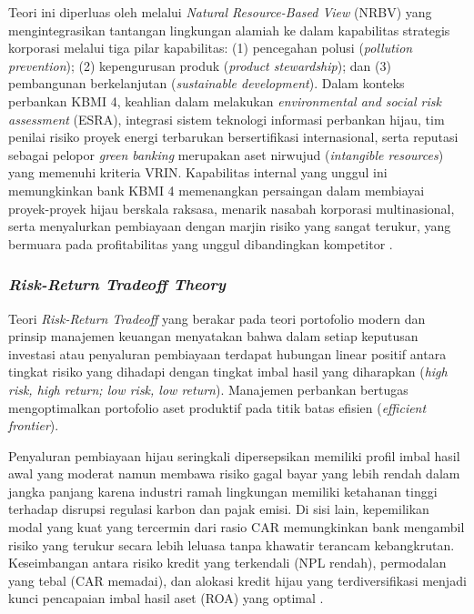 \documentclass[12pt,a4paper]{article}
\numberwithin{equation}{section}
\begin{document}
\noindent
Teori ini diperluas oleh \citet{Hart1995} melalui \emph{Natural Resource-Based View} (NRBV) yang mengintegrasikan tantangan lingkungan alamiah ke dalam kapabilitas strategis korporasi melalui tiga pilar kapabilitas: (1) pencegahan polusi (\emph{pollution prevention}); (2) kepengurusan produk (\emph{product stewardship}); dan (3) pembangunan berkelanjutan (\emph{sustainable development}). Dalam konteks perbankan KBMI 4, keahlian dalam melakukan \emph{environmental and social risk assessment} (ESRA), integrasi sistem teknologi informasi perbankan hijau, tim penilai risiko proyek energi terbarukan bersertifikasi internasional, serta reputasi sebagai pelopor \emph{green banking} merupakan aset nirwujud (\emph{intangible resources}) yang memenuhi kriteria VRIN. Kapabilitas internal yang unggul ini memungkinkan bank KBMI 4 memenangkan persaingan dalam membiayai proyek-proyek hijau berskala raksasa, menarik nasabah korporasi multinasional, serta menyalurkan pembiayaan dengan marjin risiko yang sangat terukur, yang bermuara pada profitabilitas yang unggul dibandingkan kompetitor \citep{Zhang2022, Hart1995}.

\subsubsection{\emph{Risk-Return Tradeoff Theory}}
\noindent
Teori \emph{Risk-Return Tradeoff} yang berakar pada teori portofolio modern \citet{Markowitz1952} dan prinsip manajemen keuangan \citet{BrighamEhrhardt2020} menyatakan bahwa dalam setiap keputusan investasi atau penyaluran pembiayaan terdapat hubungan linear positif antara tingkat risiko yang dihadapi dengan tingkat imbal hasil yang diharapkan (\emph{high risk, high return; low risk, low return}). Manajemen perbankan bertugas mengoptimalkan portofolio aset produktif pada titik batas efisien (\emph{efficient frontier}).

\noindent
Penyaluran pembiayaan hijau seringkali dipersepsikan memiliki profil imbal hasil awal yang moderat namun membawa risiko gagal bayar yang lebih rendah dalam jangka panjang karena industri ramah lingkungan memiliki ketahanan tinggi terhadap disrupsi regulasi karbon dan pajak emisi. Di sisi lain, kepemilikan modal yang kuat yang tercermin dari rasio CAR memungkinkan bank mengambil risiko yang terukur secara lebih leluasa tanpa khawatir terancam kebangkrutan. Keseimbangan antara risiko kredit yang terkendali (NPL rendah), permodalan yang tebal (CAR memadai), dan alokasi kredit hijau yang terdiversifikasi menjadi kunci pencapaian imbal hasil aset (ROA) yang optimal \citep{BrighamHouston2021, Chiaramonte2020}.
\end{document}
